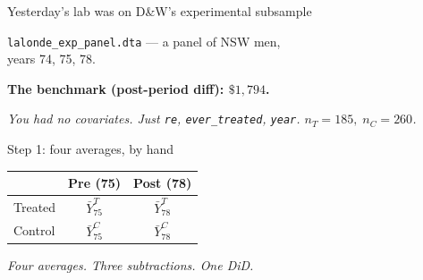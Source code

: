 \documentclass[11pt,aspectratio=169]{beamer}
\begin{document}

\begin{frame}{Yesterday's lab was on D\&W's experimental subsample}
\vspace{1em}
\begin{center}
\large
\texttt{lalonde\_exp\_panel.dta} \;--- a panel of NSW men, \\[0.2em] years 74, 75, 78.
\end{center}
\vspace{0.6em}
\begin{center}
\large
\textbf{The benchmark (post-period diff): $\$1{,}794$.}
\end{center}
\vspace{0.6em}
\begin{center}
\small\color{warmgray}\itshape
You had \textit{no covariates}. \;Just \texttt{re}, \texttt{ever\_treated}, \texttt{year}. \;\;$n_T = 185, \;n_C = 260$.
\end{center}
\end{frame}

\begin{frame}{Step 1: four averages, by hand}
\vspace{0.4em}
\begin{center}
\small
\renewcommand{\arraystretch}{1.4}
\begin{tabular}{@{}lcc@{}}
\toprule
 & \textbf{Pre (75)} & \textbf{Post (78)} \\
\midrule
Treated   & $\bar Y^T_{75}$ & $\bar Y^T_{78}$ \\
Control   & $\bar Y^C_{75}$ & $\bar Y^C_{78}$ \\
\bottomrule
\end{tabular}
\end{center}
\vspace{0.8em}
\begin{center}
\small\color{warmgray}\itshape
Four averages. Three subtractions. \;One DiD.
\end{center}
\end{frame}
\end{document}
